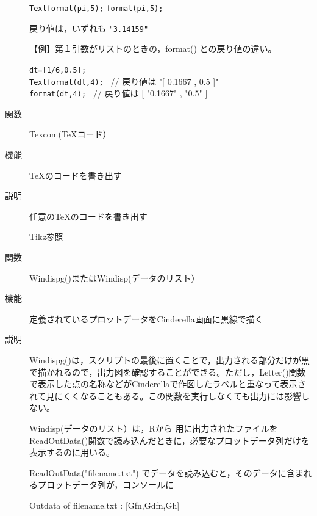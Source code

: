\documentclass[papersize,a4paper,12pt,uplatex]{jsarticle}
\begin{document}
\begin{description}
\hspace{10mm} \verb|Textformat(pi,5);|
\hspace{10mm} \verb|format(pi,5);|

戻り値は，いずれも \verb|"3.14159"|

\vspace{\baselineskip}
【例】第１引数がリストのときの，format() との戻り値の違い。

\hspace{10mm} \verb|dt=[1/6,0.5];|\\
\hspace{10mm} \verb|Textformat(dt,4); | // 戻り値は "[ 0.1667 , 0.5 ]" \\
\hspace{10mm} \verb|format(dt,4); | // 戻り値は [ "0.1667" , "0.5" ] \\


\vspace{\baselineskip}
\hypertarget{texcom}{}
\item[関数]Texcom(\TeX コード）
\item[機能]\TeX のコードを書き出す
\item[説明]任意の\TeX のコードを書き出す

\hspace*{10mm}\hyperlink{tikztexcom}{Tikz}参照

\vspace{\baselineskip}
\hypertarget{windispg}{}
\item[関数]Windispg()またはWindisp(データのリスト）
\item[機能]定義されているプロットデータをCinderella画面に黒線で描く
\item[説明]Windispg()は，スクリプトの最後に置くことで，出力される部分だけが黒で描かれるので，出力図を確認することができる。ただし，Letter()関数で表示した点の名称などがCinderellaで作図したラベルと重なって表示されて見にくくなることもある。この関数を実行しなくても出力には影響しない。

Windisp(データのリスト）は，Rから \ketcindy 用に出力されたファイルを ReadOutData()関数で読み込んだときに，必要なプロットデータ列だけを表示するのに用いる。

ReadOutData("filename.txt") でデータを読み込むと，そのデータに含まれるプロットデータ列が，コンソールに

\hspace{10mm}Outdata of filename.txt : [Gfn,Gdfn,Gh] 


\end{description}
\end{document}

